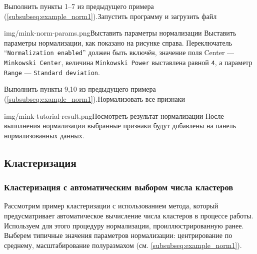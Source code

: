 \documentclass[12pt,tikz]{instruction}
\begin{document}
\begin{steps}
	\begin{istt}{Выполнить пункты 1--7 из предыдущего примера (\ref{subsubseq:example_norm1}).}{Запустить программу и загрузить файл}
	\end{istt}
	\begin{ist}{img/mink-norm-params.png}{Выставить параметры нормализации}
		Выставить параметры нормализации, как показано на рисунке справа. Переключатель ``\texttt{Normalization enabled}'' должен быть включён, значение поля Center --- \texttt{Minkowski Center}, величина \texttt{Minkowski Power} выставлена равной \texttt{4}, а параметр \texttt{Range} --- \texttt{Standard deviation}.
	\end{ist}
	\begin{istt}{Выполнить пункты 9,10 из предыдущего примера (\ref{subsubseq:example_norm1}).}{Нормализовать все признаки}
	\end{istt}
	\begin{ist}{img/mink-tutorial-result.png}{Посмотреть результат нормализации}
		После выполнения нормализации выбранные признаки будут добавлены на панель нормализованных данных.
	\end{ist}
\end{steps}

\subsection{Кластеризация}
\subsubsection{Кластеризация с автоматическим выбором числа кластеров}
\label{subsubsec:clustering_example1}
Рассмотрим пример кластеризации с использованием метода, который предусматривает автоматическое вычисление числа кластеров в процессе работы. Используем для этого процедуру нормализации, проиллюстрированную ранее. Выберем типичные значения параметров нормализации: центрирование по среднему, масштабирование полуразмахом (см. \ref{subsubseq:example_norm1}). 
\end{document}
